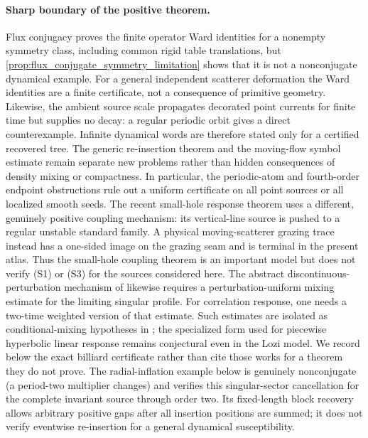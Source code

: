 \documentclass[11pt]{amsart}
\theoremstyle{compactplain}
\theoremstyle{compactdefinition}
\theoremstyle{compactremark}
\begin{document}
\paragraph{Sharp boundary of the positive theorem.}
Flux conjugacy proves the finite operator Ward identities for a nonempty
symmetry class, including common rigid table translations, but
\cref{prop:flux_conjugate_symmetry_limitation} shows that it is not a
nonconjugate dynamical example.  For a general
independent scatterer deformation the Ward identities are a finite certificate,
not a consequence of primitive geometry.  Likewise, the ambient source scale
propagates decorated point currents for finite time but supplies no decay: a
regular periodic orbit gives a direct counterexample.  Infinite dynamical
words are therefore stated only for a certified recovered tree.  The generic
re-insertion theorem and the moving-flow symbol estimate remain separate new
problems rather than hidden consequences of density mixing or compactness.
In particular, the periodic-atom and fourth-order endpoint obstructions rule
out a uniform certificate on all point sources or all localized smooth seeds.
The recent small-hole response theorem
\cite{Canestrari2026SmallHoles} uses a different, genuinely positive coupling
mechanism: its vertical-line source is pushed to a regular unstable standard
family.  A physical moving-scatterer grazing trace instead has a one-sided
image on the grazing seam and is terminal in the present atlas.  Thus the
small-hole coupling theorem is an important model but does not verify (S1) or
(S3) for the sources considered here.
The abstract discontinuous-perturbation mechanism of
\cite{Canestrari2026Discontinuous} likewise requires a perturbation-uniform
mixing estimate for the limiting singular profile.  For correlation response,
one needs a two-time weighted version of that estimate.  Such estimates are
isolated as conditional-mixing hypotheses in
\cite{Wormell2024ConditionalMixing,Wormell2024PiecewiseResponse}; the
specialized form used for piecewise hyperbolic linear response remains
conjectural even in the Lozi model.  We record below the exact billiard
certificate rather than cite those works for a theorem they do not prove.
The radial-inflation example below is genuinely nonconjugate (a period-two
multiplier changes) and verifies this singular-sector cancellation for the
complete invariant source through order two.  Its fixed-length block recovery
allows arbitrary positive gaps after all insertion positions are summed; it
does not verify eventwise re-insertion for a general dynamical susceptibility.
\end{document}
